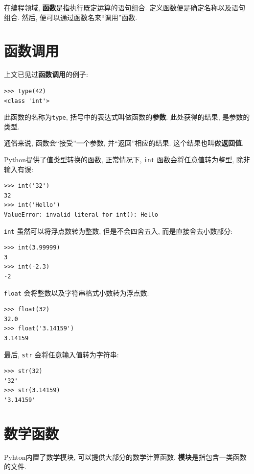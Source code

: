 \documentclass[10pt]{book}
\begin{document}
在编程领域, {\bf 函数}是指执行既定运算的语句组合. 
定义函数便是确定名称以及语句组合. 然后, 便可以通过函数名来``调用''函数. 

\section{函数调用}
\label{functionchap}

上文已见过{\bf 函数调用}的例子:

\begin{verbatim}
>>> type(42)
<class 'int'>
\end{verbatim}
%
此函数的名称为{\tt type},  括号中的表达式叫做函数的{\bf 参数}. 
此处获得的结果, 是参数的类型. 

通俗来说, 函数会``接受''一个参数, 并``返回''相应的结果. 
这个结果也叫做{\bf 返回值}. 

Python提供了值类型转换的函数, 正常情况下, {\tt int} 函数会将任意值转为整型, 
除非输入有误:

\begin{verbatim}
>>> int('32')
32
>>> int('Hello')
ValueError: invalid literal for int(): Hello
\end{verbatim}
%
{\tt int} 虽然可以将浮点数转为整数, 但是不会四舍五入, 而是直接舍去小数部分:

\begin{verbatim}
>>> int(3.99999)
3
>>> int(-2.3)
-2
\end{verbatim}
%
{\tt float} 会将整数以及字符串格式小数转为浮点数:

\begin{verbatim}
>>> float(32)
32.0
>>> float('3.14159')
3.14159
\end{verbatim}
%
最后, {\tt str} 会将任意输入值转为字符串:

\begin{verbatim}
>>> str(32)
'32'
>>> str(3.14159)
'3.14159'
\end{verbatim}
%

\section{数学函数}

Pyhton内置了数学模块, 可以提供大部分的数学计算函数. 
{\bf 模块}是指包含一类函数的文件. 
\end{document}
